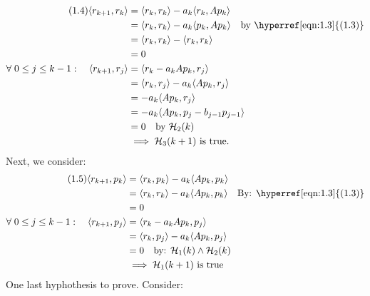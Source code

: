 \documentclass[]{article}
\begin{document}
    \begin{align*}\tag{1.4}\label{eqn:1.4}
        \langle r_{k + 1}, r_k\rangle &= 
        \langle r_k, r_k\rangle - a_k\langle r_k, Ap_k\rangle
        \\
        &= \langle r_k, r_k\rangle - a_k\langle p_k, Ap_k\rangle 
        \quad\text{by \hyperref[eqn:1.3]{(1.3)}}
        \\
        &= \langle r_k, r_k\rangle - \langle r_k, r_k\rangle
        \\
        &= 0
        \\
        \forall\; 0\le j \le k -1: \quad \langle r_{k + 1}, r_j\rangle &= 
        \langle r_k - a_kAp_k, r_j\rangle
        \\
        &= \langle r_k, r_j\rangle - a_k\langle Ap_k, r_j\rangle
        \\
        &= - a_k\langle Ap_k, r_j\rangle
        \\
        &= - a_k\langle Ap_k, p_j - b_{j - 1}p_{j - 1}\rangle
        \\
        &= 0 \quad \text{by }\mathcal{H}_2(k)
        \\
        & \implies \mathcal{H}_3(k + 1) \text{ is true}. 
    \end{align*}
    Next, we consider: 
    \begin{align*}\tag{1.5}\label{eqn:1.5}
        \langle r_{k + 1}, p_k\rangle &= 
        \langle r_k, p_k\rangle - a_k\langle Ap_k, p_k\rangle
        \\
        &= \langle r_k, r_k\rangle - a_k\langle Ap_k, p_k\rangle \quad \text{By: \hyperref[eqn:1.3]{(1.3)}}
        \\
        &= 0
        \\
        \forall \; 0\le j \le k - 1: \quad \langle r_{k + 1}, p_j\rangle
        &= \langle r_k - a_kAp_k, p_j\rangle
        \\
        &= \langle r_k, p_j\rangle - a_k\langle Ap_k, p_j\rangle
        \\
        &= 0 \quad \text{by: }\mathcal{H}_1(k) \wedge \mathcal{H}_2(k)
        \\
        & \implies \mathcal{H}_1(k + 1) \text{ is true}
    \end{align*}
    One last hyphothesis to prove. Consider: 
\end{document}
